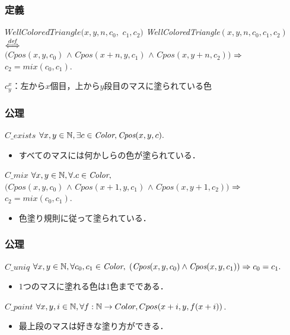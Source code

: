 \documentclass[dvipdfmx,cjk]{beamer}
\def\Color{\textit{Color}}
\def\mix{\textit{mix}}
\def\mix{\textit{mix}}
\def\Cpos{\textit{Cpos}}
\def\WCT{\textit{WellColoredTriangle}}
\def\Cexists{\textit{C\_exists}}
\def\Cuniq{\textit{C\_uniq}}
\def\Cmix{\textit{C\_mix}}
\def\Cpaint{\textit{C\_paint}}
\begin{document}
\begin{frame}
  \frametitle{定義}
  \begin{block}{$\WCT(x, y, n, c_0,$ $c_1, c_2)$}
    {\small{
        \WCT$(x, y, n, c_0, c_1, c_2)$ $\overset{{\it def}}{\Longleftrightarrow}$ \\
        $(\Cpos(x,y,c_0)$ $\land$ $\Cpos(x+n,y,c_1)$ $\land$ $\Cpos(x,y+n,c_2))$ $\Rightarrow$ $c_2 = \mix(c_0,c_1)$.
      }
    }
  \end{block}
  $c^x_y$：左から$x$個目，上から$y$段目のマスに塗られている色
  \[
  
  \]
\end{frame}

\begin{frame}
  \frametitle{公理}
  \begin{block}{$\Cexists$}
    $\forall x, y \in \N, \exists c \in \Color, \Cpos(x,y,c).$
  \end{block}
  \begin{itemize}
  \item
    すべてのマスには何かしらの色が塗られている．
  \end{itemize}
  \vfill
  \begin{block}{$\Cmix$}
    $\forall x, y \in \N, \forall. c \in \Color,$ \\
    {\small
      $(\Cpos(x,y,c_0)$ $\land$ $\Cpos(x+1,y,c_1)$ $\land$ $\Cpos(x,y+1,c_2))$ $\Rightarrow$ $c_2 = \mix(c_0,c_1)$.
    }
  \end{block}
  \begin{itemize}
  \item
    色塗り規則に従って塗られている．
  \end{itemize}
  \begin{center}
    
  \end{center}
\end{frame}

\begin{frame}
  \frametitle{公理}
  \begin{block}{$\Cuniq$}
    $\forall x, y \in \N, \forall c_0, c_1 \in \Color,$ 
    $(\Cpos(x,y,c_0) \land \Cpos(x,y,c_1)) \Imp c_0 = c_1.$
  \end{block}
  \begin{itemize}
  \item
    $1$つのマスに塗れる色は$1$色までである．
  \end{itemize}
  \vfill
  \begin{block}{$\Cpaint$}
    $\forall x, y, i \in \mathbb{N}, \forall f:\mathbb{N} \to Color, Cpos(x+i,y,f(x+i))$.
  \end{block}
  \begin{itemize}
  \item
    最上段のマスは好きな塗り方ができる．
  \end{itemize}
  \begin{center}
    
  \end{center}
\end{frame}
\end{document}
